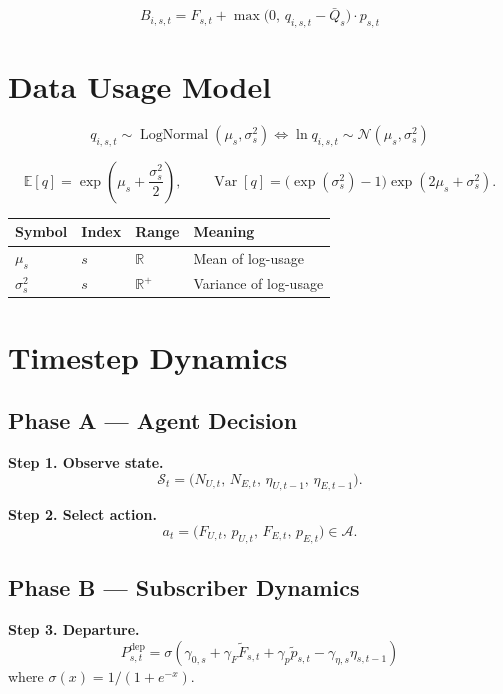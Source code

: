 \documentclass[11pt]{article}
\begin{document}
\begin{equation}
B_{i,s,t} = F_{s,t} + \max\bigl(0,\, q_{i,s,t} - \bar{Q}_{s}\bigr) \cdot p_{s,t}
\tag{F1}
\end{equation}

\section{Data Usage Model}

\begin{equation}
q_{i,s,t} \sim \operatorname{LogNormal}(\mu_s,\sigma_s^2)
\iff
\ln q_{i,s,t} \sim \mathcal{N}(\mu_s,\sigma_s^2)
\tag{F2}
\end{equation}

\begin{equation*}
\mathbb{E}[q] = \exp\!\left(\mu_s + \frac{\sigma_s^2}{2}\right),
\qquad
\operatorname{Var}[q] = \bigl(\exp(\sigma_s^2) - 1\bigr)\exp(2\mu_s + \sigma_s^2).
\end{equation*}

\begin{longtable}{@{}llll@{}}
\toprule
Symbol & Index & Range & Meaning \\
\midrule
\endhead
$\mu_s$ & $s$ & $\mathbb{R}$ & Mean of log-usage \\
$\sigma_s^2$ & $s$ & $\mathbb{R}^{+}$ & Variance of log-usage \\
\bottomrule
\end{longtable}

\section{Timestep Dynamics}

\subsection*{Phase A --- Agent Decision}
\textbf{Step 1. Observe state.}
\begin{equation*}
\mathcal{S}_t = \bigl(N_{U,t},\, N_{E,t},\, \eta_{U,t-1},\, \eta_{E,t-1}\bigr).
\end{equation*}

\textbf{Step 2. Select action.}
\begin{equation*}
a_t = \bigl(F_{U,t},\, p_{U,t},\, F_{E,t},\, p_{E,t}\bigr) \in \mathcal{A}.
\end{equation*}

\subsection*{Phase B --- Subscriber Dynamics}
\textbf{Step 3. Departure.}
\begin{equation}
P_{s,t}^{\mathrm{dep}} = \sigma\!\left(\gamma_{0,s} + \gamma_F \tilde{F}_{s,t} + \gamma_p \tilde{p}_{s,t} - \gamma_{\eta,s}\eta_{s,t-1}\right)
\tag{F3}
\end{equation}
where $\sigma(x) = 1/(1 + e^{-x})$.\\
\end{document}
